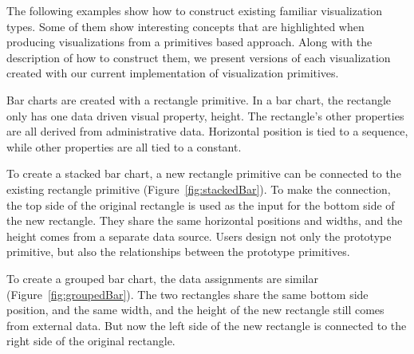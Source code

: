 The following examples show how to construct existing familiar visualization types.
Some of them show interesting concepts that are highlighted when producing visualizations from a primitives based approach.
Along with the description of how to construct them, we present versions of each visualization created with our current implementation of visualization primitives.

\label{barChart}

Bar charts are created with a rectangle primitive.
In a bar chart, the rectangle only has one data driven visual property, height.
The rectangle's other properties are all derived from administrative data.
Horizontal position is tied to a sequence, while other properties are all tied to a constant.

To create a stacked bar chart, a new rectangle primitive can be connected to the existing rectangle primitive (Figure~\ref{fig:stackedBar}).
To make the connection, the top side of the original rectangle is used as the input for the bottom side of the new rectangle.
They share the same horizontal positions and widths, and the height comes from a separate data source.
Users design not only the prototype primitive, but also the relationships between the prototype primitives.

To create a grouped bar chart, the data assignments are similar (Figure~\ref{fig:groupedBar}).
The two rectangles share the same bottom side position, and the same width, and the height of the new rectangle still comes from external data.
But now the left side of the new rectangle is connected to the right side of the original rectangle.

